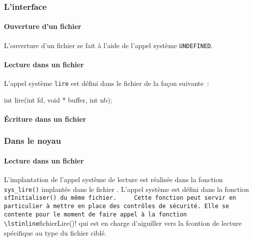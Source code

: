 \subsubsection{L'interface}

%
%
%
\paragraph{Ouverture d'un fichier}

L'ouverture d'un fichier se fait à l'aide de l'appel système
\lstinline!UNDEFINED!.

%
%
%
\paragraph{Lecture dans un fichier}

L'appel système \lstinline!lire! est défini dans le fichier
 de la façon suivante~:

\begin{lstlistings}
int lire(int fd, void * buffer, int nb);
\end{lstlistings}

%
%
%
\paragraph{Écriture dans un fichier}

%
\subsubsection{Dans le noyau}

%
%
%
\paragraph{Lecture dans un fichier}

   L'implantation de l'appel système de lecture est réalisée dans la
fonction \lstinline!sys_lire()! implantée dans le fichier
. L'appel système est défini dans la fonction
\lstinline!sfInitialiser() du même fichier.

   Cette fonction peut servir en particulier à mettre en place des
contrôles de sécurité. Elle se contente pour le moment de faire appel
à la fonction \lstinline!fichierLire()! qui est en charge d'aiguiller
vers la fcontion de lecture spécifique au type du fichier ciblé.

